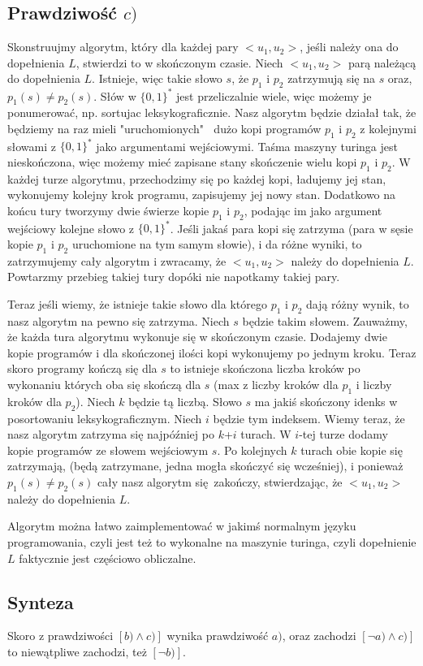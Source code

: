 \documentclass{article}
\begin{document}
\subsection*{Prawdziwość $c)$}
Skonstruujmy algorytm, który dla każdej pary $<u_1, u_2>$, jeśli należy ona do dopełnienia $L$, stwierdzi to w skończonym czasie. \newline
Niech $<u_1, u_2>$ parą należącą do dopełnienia $L$.
Istnieje, więc takie słowo $s$, że $p_1$ i $p_2$ zatrzymują się na $s$ oraz, $p_1(s) \neq p_2(s)$.
Słów w $\{0,1\}^*$ jest przeliczalnie wiele, więc możemy je ponumerować, np. sortujac leksykograficznie. \newline
Nasz algorytm będzie działał tak, że będziemy na raz mieli "uruchomionych" $\:$ dużo kopi programów $p_1$ i $p_2$ z kolejnymi słowami z $\{0,1\}^*$ jako argumentami wejściowymi. 
Taśma maszyny turinga jest nieskończona, więc możemy mieć zapisane stany skończenie wielu kopi $p_1$ i $p_2$.
W każdej turze algorytmu, przechodzimy się po każdej kopi, ładujemy jej stan, wykonujemy kolejny krok programu, zapisujemy jej nowy stan. Dodatkowo na końcu tury tworzymy dwie świerze kopie $p_1$ i $p_2$, podając im jako argument wejściowy kolejne słowo z $\{0,1\}^*$.
Jeśli jakaś para kopi się zatrzyma (para w sęsie kopie $p_1$ i $p_2$ uruchomione na tym samym słowie), i da różne wyniki, to zatrzymujemy cały algorytm i zwracamy, że $<u_1, u_2>$ należy do dopełnienia $L$. Powtarzmy przebieg takiej tury dopóki nie napotkamy takiej pary. \newline \newline

Teraz jeśli wiemy, że istnieje takie słowo dla którego $p_1$ i $p_2$ dają różny wynik, to nasz algorytm na pewno się zatrzyma. Niech $s$ będzie takim słowem.
Zauważmy, że każda tura algorytmu wykonuje się w skończonym czasie. Dodajemy dwie kopie programów i dla skończonej ilości kopi wykonujemy po jednym kroku. Teraz skoro programy kończą się dla $s$ to istnieje skończona liczba kroków po wykonaniu których oba się skończą dla $s$ (max z liczby kroków dla $p_1$ i liczby kroków dla $p_2$). Niech $k$ będzie tą liczbą. \newline
Słowo $s$ ma jakiś skończony idenks w posortowaniu leksykograficznym. Niech $i$ będzie tym indeksem.
Wiemy teraz, że nasz algorytm zatrzyma się najpóźniej po $k$+$i$ turach. W $i$-tej turze dodamy kopie programów ze słowem wejściowym $s$. Po kolejnych $k$ turach obie kopie się zatrzymają, (będą zatrzymane, jedna mogła skończyć się wcześniej), i ponieważ $p_1(s) \neq p_2(s)$ cały nasz algorytm się zakończy, stwierdzając, że $<u_1, u_2>$ należy do dopełnienia $L$. \newline 

Algorytm można łatwo zaimplementować w jakimś normalnym języku programowania, czyli jest też to wykonalne na maszynie turinga, czyli dopełnienie $L$ faktycznie jest częściowo obliczalne.

\subsection*{Synteza}
Skoro z prawdziwości $\displaystyle \left[ b) \land c) \right]$ wynika prawdziwość $a)$, oraz zachodzi $[\lnot a) \land c)]$ to niewątpliwe zachodzi, też $[\lnot b)]$.
\end{document}
